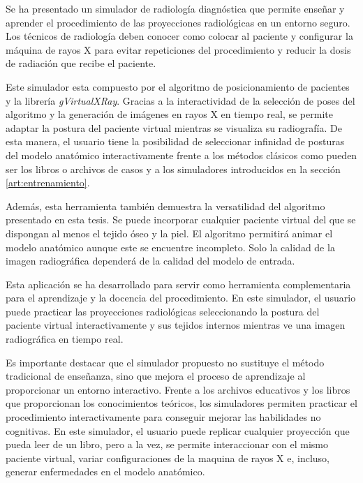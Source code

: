 Se ha presentado un simulador de radiología diagnóstica que permite enseñar y aprender el procedimiento de las proyecciones radiológicas en un entorno seguro. Los técnicos de radiología deben conocer como colocar al paciente y configurar la máquina de rayos X para evitar repeticiones del procedimiento y reducir la dosis de radiación que recibe el paciente.

Este simulador esta compuesto por el algoritmo de posicionamiento de pacientes y la librería \emph{gVirtualXRay}. Gracias a la interactividad de la selección de poses del algoritmo y la generación de imágenes en rayos X en tiempo real, se permite adaptar la postura del paciente virtual mientras se visualiza su radiografía. De esta manera, el usuario tiene la posibilidad de seleccionar infinidad de posturas del modelo anatómico interactivamente frente a los métodos clásicos como pueden ser los libros o archivos de casos y a los simuladores introducidos en la sección \ref{art:entrenamiento}.

Además, esta herramienta también demuestra la versatilidad del algoritmo presentado en esta tesis. Se puede incorporar cualquier paciente virtual del que se dispongan al menos el tejido óseo y la piel. El algoritmo permitirá animar el modelo anatómico aunque este se encuentre incompleto. Solo la calidad de la imagen radiográfica dependerá de la calidad del modelo de entrada.

Esta aplicación se ha desarrollado para servir como herramienta complementaria para el aprendizaje y la docencia del procedimiento. %
En este simulador, el usuario puede practicar las proyecciones radiológicas seleccionando la postura del paciente virtual interactivamente y sus tejidos internos mientras ve una imagen radiográfica en tiempo real. 

Es importante destacar que el simulador propuesto no sustituye el método tradicional de enseñanza, sino que mejora el proceso de aprendizaje al proporcionar un entorno interactivo. Frente a los archivos educativos y los libros que proporcionan los conocimientos teóricos, los simuladores permiten practicar el procedimiento interactivamente para conseguir mejorar las habilidades no cognitivas. En este simulador, el usuario puede replicar cualquier proyección que pueda leer de un libro, pero a la vez, se permite interaccionar con el mismo paciente virtual, variar configuraciones de la maquina de rayos X e, incluso, generar enfermedades en el modelo anatómico.

